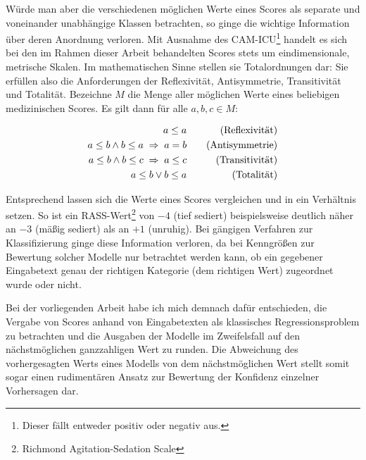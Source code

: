 Würde man aber die verschiedenen möglichen Werte eines Scores als separate und voneinander unabhängige Klassen betrachten, so ginge die wichtige Information über deren Anordnung verloren. Mit Ausnahme des CAM-ICU\footnote{Dieser fällt entweder positiv oder negativ aus.} handelt es sich bei den im Rahmen dieser Arbeit behandelten Scores stets um eindimensionale, metrische Skalen. Im mathematischen Sinne stellen sie Totalordnungen dar: Sie erfüllen also die Anforderungen der Reflexivität, Antisymmetrie, Transitivität und Totalität. Bezeichne $M$ die Menge aller möglichen Werte eines beliebigen medizinischen Scores. Es gilt dann für alle $a,b,c \in M$:

\begin{equation*}
    \centering
    \begin{aligned}[c]
        a \leq a\\
        a \leq b \land b \leq a \; \Rightarrow \; a=b\\
        a \leq b \land b \leq c \; \Rightarrow \; a \leq c\\
        a \leq b \lor b \leq a
    \end{aligned}
    \qquad
    \begin{aligned}[c]
        \text{(Reflexivität)}\\
        \text{(Antisymmetrie)}\\
        \text{(Transitivität)}\\
        \text{(Totalität)}
    \end{aligned}
\end{equation*}

Entsprechend lassen sich die Werte eines Scores vergleichen und in ein Verhältnis setzen. So ist ein RASS-Wert\footnote{Richmond Agitation-Sedation Scale} von $-4$ (tief sediert) beispielsweise deutlich näher an $-3$ (mäßig sediert) als an $+1$ (unruhig). Bei gängigen Verfahren zur Klassifizierung ginge diese Information verloren, da bei Kenngrößen zur Bewertung solcher Modelle nur betrachtet werden kann, ob ein gegebener Eingabetext genau der richtigen Kategorie (dem richtigen Wert) zugeordnet wurde oder nicht. 

Bei der vorliegenden Arbeit habe ich mich demnach dafür entschieden, die Vergabe von Scores anhand von Eingabetexten als klassisches Regressionsproblem zu betrachten und die Ausgaben der Modelle im Zweifelsfall auf den nächstmöglichen ganzzahligen Wert zu runden. Die Abweichung des vorhergesagten Werts eines Modells von dem nächstmöglichen Wert stellt somit sogar einen rudimentären Ansatz zur Bewertung der Konfidenz einzelner Vorhersagen dar. %

